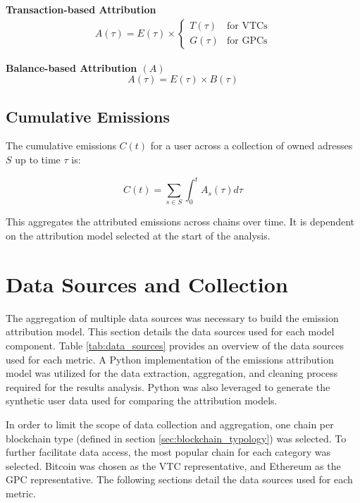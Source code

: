 \documentclass[11pt]{report}
\begin{document}
\textbf{Transaction-based Attribution}
\begin{align}
    A(\tau) = E(\tau) \times \begin{cases}
                                 T(\tau) & \text{for VTCs} \\
                                 G(\tau) & \text{for GPCs}
                             \end{cases}
\end{align}

\textbf{Balance-based Attribution $(A)$}
\begin{equation}
    A(\tau) = E(\tau) \times B(\tau)
\end{equation}

\subsection*{Cumulative Emissions}

The cumulative emissions $C(t)$ for a user across a collection of owned adresses $S$ up to time $\tau$ is:

\begin{equation}
    C(t) = \sum_{s \in S} \int_{0}^{t} A_s(\tau) d\tau
\end{equation}

This aggregates the attributed emissions across chains over time. It is dependent on the attribution model selected at the start of the analysis.

\section{Data Sources and Collection \label{sec:data_sources}}

The aggregation of multiple data sources was necessary to build the emission attribution model. This section details the data sources used for each model component. Table \ref{tab:data_sources} provides an overview of the data sources used for each metric. A Python implementation of the emissions attribution model was utilized for the data extraction, aggregation, and cleaning process required for the results analysis. Python was also leveraged to generate the synthetic user data used for comparing the attribution models.

In order to limit the scope of data collection and aggregation, one chain per blockchain type (defined in section \ref{sec:blockchain_typology}) was selected. To further facilitate data access, the most popular chain for each category was selected. Bitcoin was chosen as the VTC representative, and Ethereum as the GPC representative. The following sections detail the data sources used for each metric.
\end{document}
